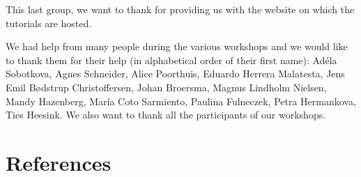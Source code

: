 \documentclass[
]{article}
\begin{document}
This last group, we want to thank for providing us with the website on which the tutorials are hosted.

We had help from many people during the various workshops and we would like to thank them for their help (in alphabetical order of their first name): Adéla Sobotkova, Agnes Schneider, Alice Poorthuis, Eduardo Herrera Malatesta, Jens Emil Bødstrup Christoffersen, Johan Broersma, Magnus Lindholm Nielsen, Mandy Hazenberg, María Coto Sarmiento, Paulina Fulneczek, Petra Hermankova, Ties Heesink. We also want to thank all the participants of our workshops.

\hypertarget{references}{%
\section*{References}\label{references}}
\end{document}

